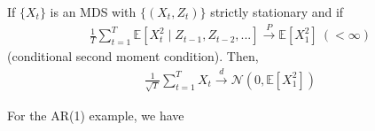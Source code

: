 \documentclass[11pt]{elegantbook}
\begin{document}
\begin{theorem}
    If $\{X_t\}$ is an MDS with $\{(X_t,Z_t)\}$ strictly stationary and if
    \begin{equation}
        \begin{aligned}
            \frac{1}{T}\sum_{t=1}^T \mathbb{E}\left[X_t^2\mid Z_{t-1},Z_{t-2},...\right] \stackrel{P}{\longrightarrow} \mathbb{E}[X_1^2]\ (<\infty)
        \end{aligned}
        \nonumber
    \end{equation}
    (conditional second moment condition).
    Then,
    \begin{equation}
        \begin{aligned}
            \frac{1}{\sqrt{T}}\sum_{t=1}^T X_t \stackrel{d}{\longrightarrow} \mathcal{N}\left(0,\mathbb{E}[X_1^2]\right)
        \end{aligned}
        \nonumber
    \end{equation}
\end{theorem}
For the AR(1) example, we have
\end{document}
